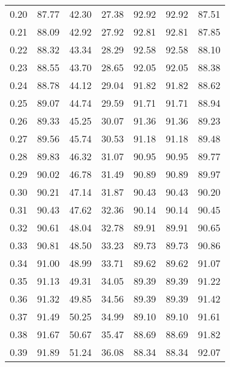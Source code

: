 \begin{tabular}{|c|c|c|c|c|c|c|}
      0.20 &     87.77 &     42.30 &      27.38 &   92.92 &      92.92 &         87.51 \\
      0.21 &     88.09 &     42.92 &      27.92 &   92.81 &      92.81 &         87.85 \\
      0.22 &     88.32 &     43.34 &      28.29 &   92.58 &      92.58 &         88.10 \\
      0.23 &     88.55 &     43.70 &      28.65 &   92.05 &      92.05 &         88.38 \\
      0.24 &     88.78 &     44.12 &      29.04 &   91.82 &      91.82 &         88.62 \\
      0.25 &     89.07 &     44.74 &      29.59 &   91.71 &      91.71 &         88.94 \\
      0.26 &     89.33 &     45.25 &      30.07 &   91.36 &      91.36 &         89.23 \\
      0.27 &     89.56 &     45.74 &      30.53 &   91.18 &      91.18 &         89.48 \\
      0.28 &     89.83 &     46.32 &      31.07 &   90.95 &      90.95 &         89.77 \\
      0.29 &     90.02 &     46.78 &      31.49 &   90.89 &      90.89 &         89.97 \\
      0.30 &     90.21 &     47.14 &      31.87 &   90.43 &      90.43 &         90.20 \\
      0.31 &     90.43 &     47.62 &      32.36 &   90.14 &      90.14 &         90.45 \\
      0.32 &     90.61 &     48.04 &      32.78 &   89.91 &      89.91 &         90.65 \\
      0.33 &     90.81 &     48.50 &      33.23 &   89.73 &      89.73 &         90.86 \\
      0.34 &     91.00 &     48.99 &      33.71 &   89.62 &      89.62 &         91.07 \\
      0.35 &     91.13 &     49.31 &      34.05 &   89.39 &      89.39 &         91.22 \\
      0.36 &     91.32 &     49.85 &      34.56 &   89.39 &      89.39 &         91.42 \\
      0.37 &     91.49 &     50.25 &      34.99 &   89.10 &      89.10 &         91.61 \\
      0.38 &     91.67 &     50.67 &      35.47 &   88.69 &      88.69 &         91.82 \\
      0.39 &     91.89 &     51.24 &      36.08 &   88.34 &      88.34 &         92.07 \\

\end{tabular}
